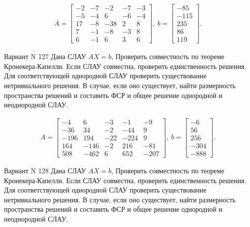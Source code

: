 \documentclass[11pt]{report}
\begin{document}
\begin{align*}
 A = \left[\begin{matrix}-2 & -7 & -2 & -7 & -3\\-5 & -4 & 6 & -6 & -4\\17 & -8 & -38 & 2 & 8\\7 & -1 & -8 & -3 & 8\\6 & -1 & 6 & 3 & 6\end{matrix}\right],
\ b = \left[\begin{matrix}-85\\-115\\235\\86\\119\end{matrix}\right]. 
 \end{align*}

Вариант N 127
Дана СЛАУ $AX = b$,
Проверить совместность по теореме Кронекера-Капелли. Если СЛАУ совместна, проверить единственность решения.
Для соответствующей однородной СЛАУ проверить существование нетривиального решения. В случае, если оно существует,
найти размерность пространства решений и составить ФСР и общее решение однородной  и неоднородной СЛАУ.


\begin{align*}
 A = \left[\begin{matrix}-4 & 6 & -3 & -1 & -9\\-36 & 34 & -2 & -44 & 9\\-196 & 194 & -22 & -224 & 9\\164 & -146 & -2 & 216 & -81\\508 & -462 & 6 & 652 & -207\end{matrix}\right],
\ b = \left[\begin{matrix}-6\\56\\256\\-304\\-888\end{matrix}\right]. 
 \end{align*}

Вариант N 128
Дана СЛАУ $AX = b$,
Проверить совместность по теореме Кронекера-Капелли. Если СЛАУ совместна, проверить единственность решения.
Для соответствующей однородной СЛАУ проверить существование нетривиального решения. В случае, если оно существует,
найти размерность пространства решений и составить ФСР и общее решение однородной  и неоднородной СЛАУ.
\end{document}
